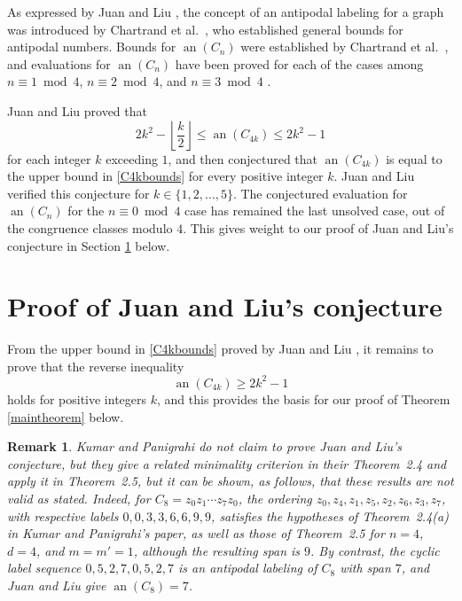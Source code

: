 \documentclass[12pt]{article}
\newtheorem{remark}{Remark}
\begin{document}
 As expressed by Juan and Liu \cite{JuanLiu2012}, the concept of an antipodal labeling for a graph was introduced by Chartrand et al.\ 
 \cite{ChartrandErwinZhang2000,ChartrandErwinZhang2002}, who established general bounds for antipodal numbers. 
 Bounds for $\operatorname{an}(C_n)$ were established by Chartrand et al.\ \cite{ChartrandErwinZhang2000}, and evaluations for 
 $\operatorname{an}(C_{n})$ have been proved for each of the cases among
 $n \equiv 1 \bmod {4}$, 
 $n \equiv 2 \bmod {4}$, and 
 $n \equiv 3 \bmod {4}$ \cite{ChartrandErwinZhang2000,JuanLiu2012}.

 Juan and Liu \cite[Theorem 9]{JuanLiu2012} proved that 
\begin{equation}\label{C4kbounds}
 2k^2 - \left\lfloor \frac{k}{2} \right\rfloor \leq \operatorname{an}(C_{4k}) \leq 2k^2 - 1 
\end{equation}
 for each integer $k$ exceeding $1$, and then conjectured \cite[Conjecture 1]{JuanLiu2012} that $\operatorname{an}(C_{4k}) $ is equal to 
 the upper bound in \eqref{C4kbounds} for every positive integer $k$. Juan and Liu verified this conjecture for $k \in \{ 1, 2, \ldots, 5 \}$. 
 The conjectured evaluation for $\operatorname{an}(C_{n})$ for the $n \equiv 0 \bmod {4}$ case has remained the last unsolved case, out 
 of the congruence classes modulo $4$. 
 This gives weight to our 
 proof of Juan and Liu's conjecture in Section \ref{secmain} below. 
 
\section{Proof of Juan and Liu's conjecture}\label{secmain}
 From the upper bound in \eqref{C4kbounds} proved by Juan and Liu \cite[Theorem 9]{JuanLiu2012}, it remains to prove that the 
 reverse inequality
\begin{equation}\label{displayreverse} 
 \operatorname{an}(C_{4k}) \geq 2k^2 - 1
\end{equation}
 holds for positive integers $k$, 
 and this provides the basis for our proof of Theorem \ref{maintheorem} below. 

\begin{remark}\label{correction}
 Kumar and Panigrahi \cite{KumarPanigrahi2026} do not claim to prove Juan and Liu's conjecture, 
 but they give a related minimality criterion in their Theorem~2.4 and apply it in Theorem~2.5, 
 but it can be shown, as follows, that these results are not valid as stated. Indeed, for \(C_{8}=z_{0}z_{1}\cdots z_{7}z_{0}\), the 
 ordering \(z_{0},z_{4},z_{1},z_{5},z_{2},z_{6},z_{3},z_{7}\), with respective labels \(0,0,3,3,6,6,9,9\), satisfies the hypotheses of Theorem~2.4(a) 
 in Kumar and Panigrahi's paper, 
 as well as those of Theorem~2.5 for \(n=4\), \(d=4\), and \(m=m'=1\), although the resulting span is \(9\). By contrast, the cyclic label sequence \(0,5,2,7,0,5,2,7\) is an antipodal labeling of \(C_{8}\) with span \(7\), and Juan and Liu \cite[Theorem~9]{JuanLiu2012} give \(\operatorname{an}(C_{8})=7\).
\end{remark}
\end{document}
